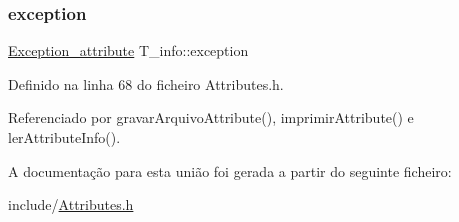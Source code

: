 \mbox{\label{unionT__info_a68a6d821e7e97d1ef51c7601694f5a09}} 
\subsubsection{\texorpdfstring{exception}{exception}}
{\footnotesize\ttfamily \hyperlink{structException__attribute}{Exception\+\_\+attribute} T\+\_\+info\+::exception}



Definido na linha 68 do ficheiro Attributes.\+h.



Referenciado por gravar\+Arquivo\+Attribute(), imprimir\+Attribute() e ler\+Attribute\+Info().



A documentação para esta união foi gerada a partir do seguinte ficheiro\+:\begin{DoxyCompactItemize}
\item 
include/\hyperlink{Attributes_8h}{Attributes.\+h}\end{DoxyCompactItemize}
